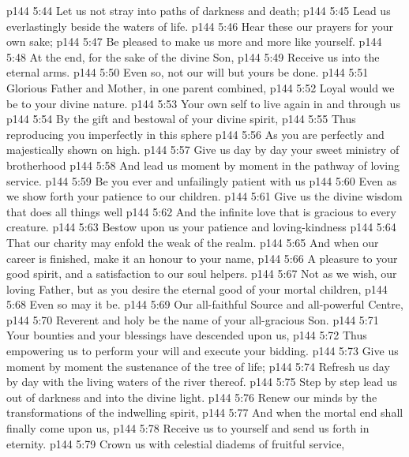 \vs p144 5:44 Let us not stray into paths of darkness and death;
\vs p144 5:45 \hsetoff Lead us everlastingly beside the waters of life.
\vs p144 5:46 Hear these our prayers for your own sake;
\vs p144 5:47 \hsetoff Be pleased to make us more and more like yourself.
\vs p144 5:48 At the end, for the sake of the divine Son,
\vs p144 5:49 \hsetoff Receive us into the eternal arms.
\vs p144 5:50 Even so, not our will but yours be done.
\separatorshort
\vs p144 5:51 Glorious Father and Mother, in one parent combined,
\vs p144 5:52 \hsetoff Loyal would we be to your divine nature.
\vs p144 5:53 Your own self to live again in and through us
\vs p144 5:54 \hsetoff By the gift and bestowal of your divine spirit,
\vs p144 5:55 Thus reproducing you imperfectly in this sphere
\vs p144 5:56 \hsetoff As you are perfectly and majestically shown on high.
\vs p144 5:57 Give us day by day your sweet ministry of brotherhood
\vs p144 5:58 \hsetoff And lead us moment by moment in the pathway of loving service.
\vs p144 5:59 Be you ever and unfailingly patient with us
\vs p144 5:60 \hsetoff Even as we show forth your patience to our children.
\vs p144 5:61 Give us the divine wisdom that does all things well
\vs p144 5:62 \hsetoff And the infinite love that is gracious to every creature.
\vs p144 5:63 Bestow upon us your patience and loving\hyp{}kindness
\vs p144 5:64 \hsetoff That our charity may enfold the weak of the realm.
\vs p144 5:65 And when our career is finished, make it an honour to your name,
\vs p144 5:66 \hsetoff A pleasure to your good spirit, and a satisfaction to our soul helpers.
\vs p144 5:67 Not as we wish, our loving Father, but as you desire the eternal good of your mortal children,
\vs p144 5:68 \hsetoff Even so may it be.
\separatorshort
\vs p144 5:69 Our all\hyp{}faithful Source and all\hyp{}powerful Centre,
\vs p144 5:70 \hsetoff Reverent and holy be the name of your all\hyp{}gracious Son.
\vs p144 5:71 Your bounties and your blessings have descended upon us,
\vs p144 5:72 \hsetoff Thus empowering us to perform your will and execute your bidding.
\vs p144 5:73 Give us moment by moment the sustenance of the tree of life;
\vs p144 5:74 \hsetoff Refresh us day by day with the living waters of the river thereof.
\vs p144 5:75 Step by step lead us out of darkness and into the divine light.
\vs p144 5:76 \hsetoff Renew our minds by the transformations of the indwelling spirit,
\vs p144 5:77 And when the mortal end shall finally come upon us,
\vs p144 5:78 \hsetoff Receive us to yourself and send us forth in eternity.
\vs p144 5:79 Crown us with celestial diadems of fruitful service,
